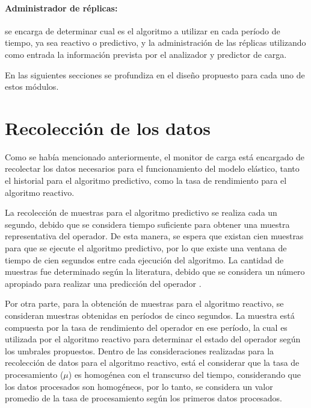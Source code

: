 \paragraph{Administrador de réplicas:} se encarga de determinar cual es el algoritmo a utilizar en cada período de tiempo, ya sea reactivo o predictivo, y la administración de las réplicas utilizando como entrada la información prevista por el analizador y predictor de carga.

\vspace*{0.5cm}

En las siguientes secciones se profundiza en el diseño propuesto para cada uno de estos módulos.

\section{Recolección de los datos}

Como se había mencionado anteriormente, el monitor de carga está encargado de recolectar los datos necesarios para el funcionamiento del modelo elástico, tanto el historial para el algoritmo predictivo, como la tasa de rendimiento para el algoritmo reactivo.

La recolección de muestras para el algoritmo predictivo se realiza cada un segundo, debido que se considera tiempo suficiente para obtener una muestra representativa del operador. De esta manera, se espera que existan cien muestras para que se ejecute el algoritmo predictivo, por lo que existe una ventana de tiempo de cien segundos entre cada ejecución del algoritmo. La cantidad de muestras fue determinado según la literatura, debido que se considera un número apropiado para realizar una predicción del operador \citep{ching2006markov}.

Por otra parte, para la obtención de muestras para el algoritmo reactivo, se consideran muestras obtenidas en períodos de cinco segundos. La muestra está compuesta por la tasa de rendimiento del operador en ese período, la cual es utilizada por el algoritmo reactivo para determinar el estado del operador según los umbrales propuestos. Dentro de las consideraciones realizadas para la recolección de datos para el algoritmo reactivo, está el considerar que la tasa de procesamiento ($\mu$) es homogénea con el transcurso del tiempo, considerando que los datos procesados son homogéneos, por lo tanto, se considera un valor promedio de la tasa de procesamiento según los primeros datos procesados. 

